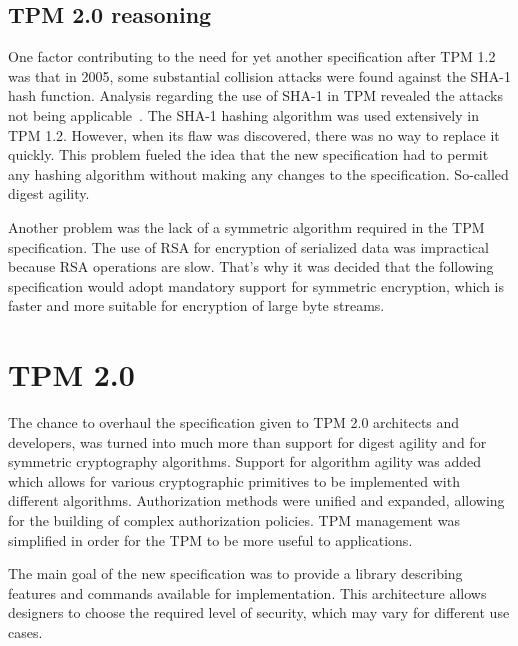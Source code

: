 
\subsection{TPM 2.0 reasoning}
One factor contributing to the need for yet another specification after TPM 1.2 was that in 2005, some substantial collision attacks were found against the SHA-1 hash function. Analysis regarding the use of SHA-1 in TPM revealed the attacks not being applicable~\cite{tcg_tpm1.12_sha-1_uses}. The SHA-1 hashing algorithm was used extensively in TPM 1.2. However, when its flaw was discovered, there was no way to replace it quickly. This problem fueled the idea that the new specification had to permit any hashing algorithm without making any changes to the specification. So-called digest agility. 

Another problem was the lack of a symmetric algorithm required in the TPM specification. The use of RSA for encryption of serialized data was impractical because RSA operations are slow. That's why it was decided that the following specification would adopt mandatory support for symmetric encryption, which is faster and more suitable for encryption of large byte streams. 


\section{TPM 2.0}\label{sec:tpm2}


The chance to overhaul the specification given to TPM 2.0 architects and developers, was turned into much more than support for digest agility and for symmetric cryptography algorithms. Support for algorithm agility was added which allows for various cryptographic primitives to be implemented with different algorithms. Authorization methods were unified and expanded, allowing for the building of complex authorization policies. TPM management was simplified in order for the TPM to be more useful to applications.

The main goal of the new specification was to provide a library describing features and commands available for implementation. This architecture allows designers to choose the required level of security, which may vary for different use cases. 

